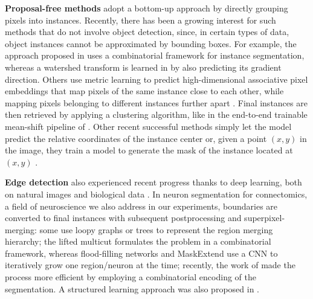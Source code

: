 \textbf{Proposal-free methods} adopt a bottom-up approach by directly grouping pixels into instances. Recently, there has been a growing interest for such  methods that do not involve object detection, since, in certain types of data, object instances cannot be approximated by bounding boxes. For example, the approach proposed in \cite{kirillov2017instancecut} uses a combinatorial framework for instance segmentation, 
whereas a watershed transform is learned in \cite{bai2017deep} by also predicting its gradient direction. 
Others use metric learning to predict high-dimensional associative pixel embeddings that map pixels of the same instance close to each other, while mapping pixels belonging to different instances further apart \cite{lee2019learning,fathi2017semantic,newell2017associative,de2017semantic}. %
Final instances are then retrieved by applying a clustering algorithm, like in the end-to-end trainable mean-shift pipeline of \cite{kong2018recurrentPix}. 
Other recent successful methods simply let the model predict the relative coordinates of the instance center \cite{neven2019instance,cheng2019panopticdeeplab} or, given a point $(x,y)$ in the image, they train a model to generate the mask of the instance located at $(x,y)$ \cite{sofiiuk2019adaptis}. 

\textbf{Edge detection} also experienced recent progress thanks to deep learning, both on natural images \cite{Gao_2019_ICCV,liu2018affinity,xie2015holistically,kokkinos2015pushing} and biological data \cite{lee2017superhuman,schmidt2018cell,meirovitch2016multi,ciresan2012deep}. In neuron segmentation for connectomics, a field of neuroscience we also address in our experiments, boundaries are converted to final instances with subsequent postprocessing and superpixel-merging:
some use loopy graphs \cite{kaynig2015large,krasowski2015improving} or trees \cite{meirovitch2016multi,liu2016sshmt,liu2014modular,funke2015learning,uzunbas2016efficient} to represent the region merging hierarchy; the lifted multicut \cite{beier2017multicut} formulates the problem in a combinatorial framework, whereas 
flood-filling networks \cite{januszewski2018high} and MaskExtend \cite{meirovitch2016multi} use a CNN to iteratively grow one region/neuron at the time; recently, the work of \cite{meirovitch2019cross} made the process more efficient by employing a combinatorial encoding of the segmentation.
A structured learning approach was also proposed in \cite{funke2018large,turaga2009maximin}.

